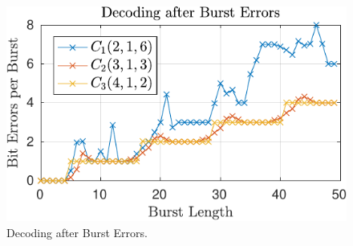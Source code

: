 \begin{figure}
\centering
\includegraphics[scale=1]{../figures/burstErrors-crop.pdf} 
\caption{Decoding after Burst Errors.}
\end{figure}